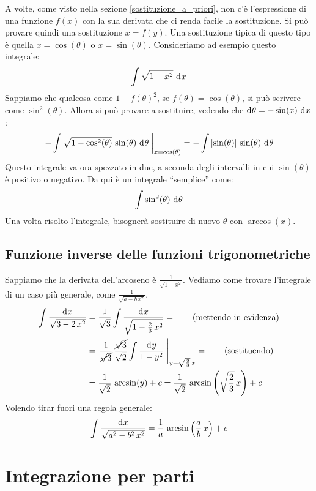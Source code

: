 A volte, come visto nella sezione \ref{sostituzione_a_priori}, non c'\`e l'espressione di una funzione $f(x)$ con la sua derivata che ci renda facile la sostituzione. Si pu\`o provare quindi una sostituzione $x = f(y)$. Una sostituzione tipica di questo tipo \`e quella $x = \cos(\theta)$ o $x = \sin(\theta)$. Consideriamo ad esempio questo integrale:
\[
\int \sqrt{1 - x^2} \dx
\]
Sappiamo che qualcosa come $1 - f(\theta)^2$, se $f(\theta) = \cos (\theta)$, si pu\`o scrivere come $\sin^2 (\theta)$. Allora si pu\`o provare a sostituire, vedendo che $\diff \theta = - \sin (x) \dx$:
\[
\substitute{ - \int \sqrt{1 - \cos^2 (\theta)} \, \sin(\theta) \dx[\theta]}{x = \cos(\theta)} =
- \int \abs{\sin(\theta)} \, \sin(\theta) \dx[\theta]
\]
Questo integrale va ora spezzato in due, a seconda degli intervalli in cui $\sin(\theta)$ \`e positivo o negativo. Da qui \`e un integrale ``semplice'' come:
\[
\int \sin^2 (\theta) \dx[\theta]
\]
Una volta risolto l'integrale, bisogner\`a sostituire di nuovo $\theta$ con $\arccos(x)$.

\subsection{Funzione inverse delle funzioni trigonometriche}
\label{integrale_arcoseno}

Sappiamo che la derivata dell'arcoseno \`e $\frac{1}{\sqrt{1 - x^2}}$. Vediamo come trovare l'integrale di un caso pi\`u generale, come $\frac{1}{\sqrt{a - b \, x^2}}$.
\begin{align*}
\int \frac{\diff x}{\sqrt{3 - 2 \, x^2}} &= 
\frac{1}{\sqrt{3}} \int \frac{\diff x}{\sqrt{1 - \frac{2}{3} \, x^2}} = \tag{mettendo in evidenza} \\
&= \substitute{\frac{1}{\cancel{\sqrt{3}}} \, \frac{\cancel{\sqrt{3}}}{\sqrt{2}} \int \frac{\diff y}{1 - y^2}}{y = \sqrt{\frac{2}{3}} \, x} = \tag{sostituendo} \\
&= \frac{1}{\sqrt{2}} \, \arcsin (y) + c =
\frac{1}{\sqrt{2}} \, \arcsin \left(\sqrt{\frac{2}{3}} \, x \right) + c
\end{align*}
Volendo tirar fuori una regola generale:
\[
\int \frac{\diff x}{\sqrt{a^2 - b^2 \, x^2}} =
\frac{1}{a} \, \arcsin \left( \frac{a}{b} \, x \right) + c
\]

\section{Integrazione per parti}

